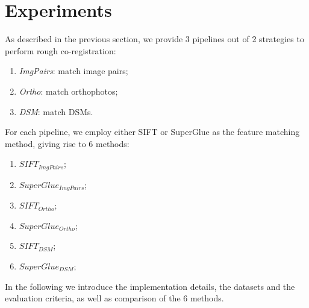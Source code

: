 
\section{Experiments}
As described in the previous section, we provide 3 pipelines out of 2 strategies to perform rough co-registration:\\
\begin{enumerate}
	\item \textit{ImgPairs}: match image pairs;
	\item \textit{Ortho}: match orthophotos;
	\item \textit{DSM}: match DSMs.
\end{enumerate}
For each pipeline, we employ either SIFT or SuperGlue as the feature matching method, giving rise to 6 methods:\\
\begin{enumerate}
    \item $SIFT_{ImgPairs}$;
    \item $SuperGlue_{ImgPairs}$;
    \item $SIFT_{Ortho}$;
    \item $SuperGlue_{Ortho}$;
    \item $SIFT_{DSM}$;
    \item $SuperGlue_{DSM}$;
\end{enumerate}
In the following we introduce the implementation details, the datasets and the evaluation criteria, as well as comparison of the 6 methods.\\

